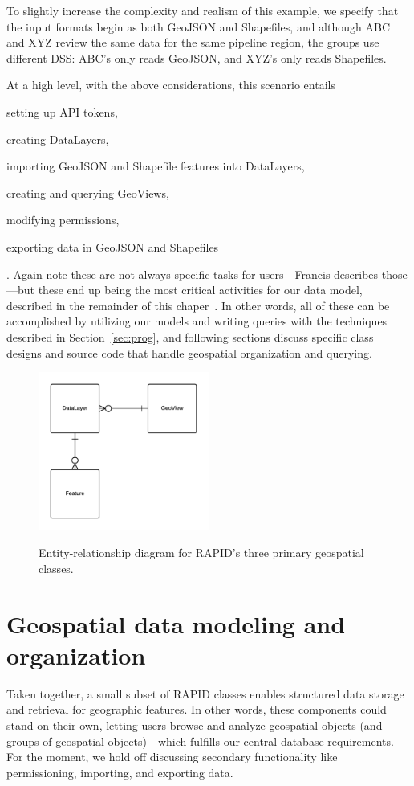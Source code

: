 To slightly increase the complexity and realism of this example, we specify that the input formats begin as both GeoJSON and Shapefiles, and although ABC and XYZ review the same data for the same pipeline region, the groups use different DSS: ABC's only reads GeoJSON, and XYZ's only reads Shapefiles.

At a high level, with the above considerations, this scenario entails
\begin{enumerate*}[label=\itshape\alph*\upshape)]
\item setting up API tokens,
\item creating DataLayers,
\item importing GeoJSON and Shapefile features into DataLayers,
\item creating and querying GeoViews,
\item modifying permissions,
\item exporting data in GeoJSON and Shapefiles
\end{enumerate*}. Again note these are not always specific tasks for users---Francis describes those---but these end up being the most critical activities for our data model, described in the remainder of this chaper~\cite{Francis}. In other words, all of these can be accomplished by utilizing our models and writing queries with the techniques described in Section~\ref{sec:prog}, and following sections discuss specific class designs and source code that handle geospatial organization and querying. 

\begin{figure}[h]
    \caption{Entity-relationship diagram for RAPID's three primary geospatial classes.}
    \centering
    \includegraphics[width=0.5\textwidth]{figures/3er.png}
    \label{fig:3er}
\end{figure}

\section{Geospatial data modeling and organization}
Taken together, a small subset of RAPID classes enables structured data storage and retrieval for geographic features. In other words, these components could stand on their own, letting users browse and analyze geospatial objects (and groups of geospatial objects)---which fulfills our central database requirements. For the moment, we hold off discussing secondary functionality like permissioning, importing, and exporting data.

